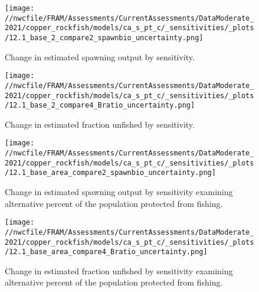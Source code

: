 \documentclass[11pt,
  english,
  a4paper,
]{article}
\begin{document}
\tagmcend\tagstructend


\begin{figure}
\centering
\texttt{[image: //nwcfile/FRAM/Assessments/CurrentAssessments/DataModerate\_2021/copper\_rockfish/models/ca\_s\_pt\_c/\_sensitivities/\_plots/12.1\_base\_2\_compare2\_spawnbio\_uncertainty.png]}
\caption{Change in estimated spawning output by sensitivity.\label{fig:sens-ssb-2}}
\end{figure}

\tagmcend\tagstructend


\begin{figure}
\centering
\texttt{[image: //nwcfile/FRAM/Assessments/CurrentAssessments/DataModerate\_2021/copper\_rockfish/models/ca\_s\_pt\_c/\_sensitivities/\_plots/12.1\_base\_2\_compare4\_Bratio\_uncertainty.png]}
\caption{Change in estimated fraction unfished by sensitivity.\label{fig:sens-depl-2}}
\end{figure}

\tagmcend\tagstructend

\newpage


\begin{figure}
\centering
\texttt{[image: //nwcfile/FRAM/Assessments/CurrentAssessments/DataModerate\_2021/copper\_rockfish/models/ca\_s\_pt\_c/\_sensitivities/\_plots/12.1\_base\_area\_compare2\_spawnbio\_uncertainty.png]}
\caption{Change in estimated spawning output by sensitivity examining alternative percent of the population protected from fishing.\label{fig:sens-area-ssb}}
\end{figure}

\tagmcend\tagstructend


\begin{figure}
\centering
\texttt{[image: //nwcfile/FRAM/Assessments/CurrentAssessments/DataModerate\_2021/copper\_rockfish/models/ca\_s\_pt\_c/\_sensitivities/\_plots/12.1\_base\_area\_compare4\_Bratio\_uncertainty.png]}
\caption{Change in estimated fraction unfished by sensitivity examining alternative percent of the population protected from fishing.\label{fig:sens-area-depl}}
\end{figure}
\end{document}
